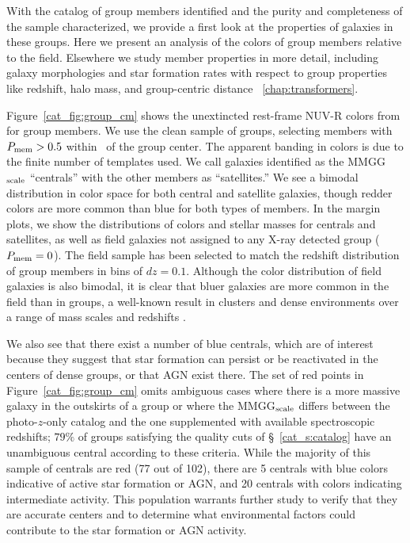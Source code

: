 With the catalog of group members identified and the purity and
completeness of the sample characterized, we provide a first look at
the properties of galaxies in these groups. Here we present
an analysis of the colors of group members
relative to the field. Elsewhere we study member properties in
more detail, including galaxy morphologies and star formation rates
with respect to group properties like redshift, halo mass, and
group-centric distance ~\ref{chap:transformers}.

Figure~\ref{cat_fig:group_cm} shows the unextincted rest-frame NUV-R
colors from \citet{Ilbert2010} for group members. We use the clean
sample of groups, selecting members with $P_{\rm mem}>0.5$ within
\rvir\ of the group center. The apparent banding in colors is due to
the finite number of templates used. We call
galaxies identified as the MMGG$_{\rm scale}$ ``centrals'' with the
other members as ``satellites.'' We see a
bimodal distribution in color space for both central and satellite
galaxies, though redder colors are more common than blue for both
types of members. In the margin plots, we show the distributions of
colors and stellar masses for centrals and satellites, as well as
field galaxies not assigned to any X-ray detected group ($P_{\rm
  mem}=0$). The field sample has been selected to match the redshift
distribution of group members in bins of $dz=0.1$. Although the color
distribution of field galaxies is also bimodal, it is clear that bluer
galaxies are more common in the field than in groups, a well-known
result in clusters and dense environments over a range of mass scales
and redshifts \citep[e.g.,][]{Gerke2007}.

We also see that there exist a number of blue centrals, which are of
interest because they suggest that star formation can persist or be
reactivated in the centers of dense groups, or that AGN exist there. The set of red
points in Figure~\ref{cat_fig:group_cm} omits ambiguous cases where there
is a more massive galaxy in the outskirts of a group or where the
MMGG$_{\rm scale}$ differs between the photo-$z$-only catalog and
the one supplemented with available spectroscopic redshifts; $79\%$ of
groups satisfying the quality cuts of \S~\ref{cat_s:catalog} have an
unambiguous central according to these criteria. While the majority of
this sample of centrals are red (77 out of 102), there are 5 centrals
with blue colors indicative of active star formation or AGN, and 20 centrals
with colors indicating intermediate activity. This population warrants
further study to verify that they are accurate centers and to
determine what environmental factors could contribute to the star
formation or AGN activity.

